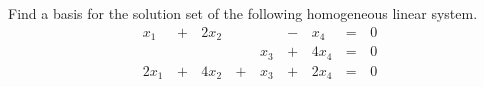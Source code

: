 \begin{applicationActivities}{3}{5}
\begin{activity}{10}
  Find a basis for the solution set of the following homogeneous linear
  system.
  \begin{alignat*}{5}
    x_1 &\,+\,& 2x_2 &\, \,&     &\,-\,&  x_4 &\,=\,& 0 \\
        &\, \,&      &\, \,& x_3 &\,+\,& 4x_4 &\,=\,& 0 \\
   2x_1 &\,+\,& 4x_2 &\,+\,& x_3 &\,+\,& 2x_4 &\,=\,& 0 \\
  \end{alignat*}
\end{activity}




\end{applicationActivities}
